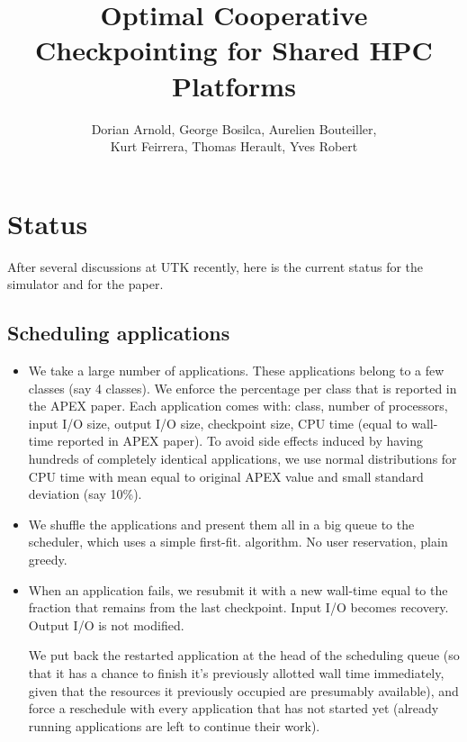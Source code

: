 \documentclass{article}
\author{Dorian Arnold, George Bosilca, Aurelien Bouteiller,\\
 Kurt Feirrera, Thomas Herault, Yves Robert}
\title{Optimal Cooperative Checkpointing for Shared HPC Platforms}
\begin{document}
\maketitle

\section{Status}

After several discussions at UTK recently, here is the current status for the simulator
and for the paper.

\subsection{Scheduling applications}

\begin{itemize}
  \item We take a large number of applications. These applications belong to a few classes
  (say 4 classes). We enforce the percentage per class that is reported in the APEX paper.
  Each application comes with: class, number of processors, input I/O size, output I/O size, 
  checkpoint size,  CPU time (equal to wall-time reported in APEX paper). To avoid side effects
  induced by having hundreds
  of completely identical applications,
  we use normal distributions for CPU time with mean equal to original APEX value and small standard deviation (say 10\%). 
  \item We shuffle the applications and present them all in a big queue to the scheduler, 
  which uses a simple first-fit.
  algorithm. No user reservation, plain greedy.
  \item When an application fails, we resubmit it with a new wall-time equal to the fraction that remains from the last checkpoint.  Input I/O becomes recovery. Output I/O is not modified. 
 
We put back the restarted application at the head of the scheduling queue 
  (so that it has a chance to finish it's previously allotted wall time 
  immediately, given that the resources it previously occupied are 
  presumably available), and force a reschedule with every application that 
  has not started yet (already running applications are left to continue 
  their work).
\end{itemize}
\end{document}
